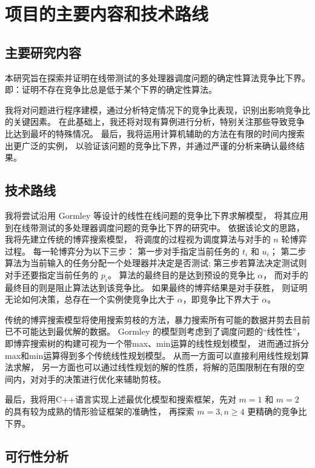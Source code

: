 \section{项目的主要内容和技术路线}

\subsection{主要研究内容}

本研究旨在探索并证明在线带测试的多处理器调度问题的确定性算法竞争比下界。
即：证明不存在竞争比总是低于某个下界的确定性算法。

我将对问题进行程序建模，通过分析特定情况下的竞争比表现，识别出影响竞争比的关键因素。
在此基础上，我还将对现有算例进行分析，特别关注那些导致竞争比达到最坏的特殊情况。
最后，我将运用计算机辅助的方法在有限的时间内搜索出更广泛的实例，
以验证该问题的竞争比下界，并通过严谨的分析来确认最终结果。

\subsection{技术路线}

我将尝试沿用 Gormley 等设计的线性在线问题的竞争比下界求解模型\cite{gormley2000generating}，
将其应用到在线带测试的多处理器调度问题的竞争比下界的研究中。
依据该论文的思路，我将先建立传统的博弈搜索模型，
将调度的过程视为调度算法与对手的 $n$ 轮博弈过程。
每一轮博弈分为以下三步：
第一步对手指定当前任务的 $t_i$ 和 $u_i$；
第二步算法为当前输入的任务分配一个处理器并决定是否测试;
第三步若算法决定测试则对手还要指定当前任务的 $p_i$。
算法的最终目的是达到预设的竞争比 $\alpha$，
而对手的最终目的则是阻止算法达到该竞争比。
如果最终的博弈结果是对手获胜，
则证明无论如何决策，总存在一个实例使竞争比大于 $\alpha$，即竞争比下界大于 $\alpha$。

传统的博弈搜索模型将使用搜索剪枝的方法，暴力搜索所有可能的数据并剪去目前已不可能达到最优解的数据。
Gormley 的模型则考虑到了调度问题的“线性性”，即博弈搜索树的构建可视为一个带max、min运算的线性规划模型，
进而通过拆分max和min运算得到多个传统线性规划模型。
从而一方面可以直接利用线性规划算法求解，
另一方面也可以通过线性规划的解的性质，将解的范围限制在有限的空间内，对对手的决策进行优化来辅助剪枝。

最后，我将用C++语言实现上述最优化模型和搜索框架，先对 $m=1$ 和 $m=2$ 的具有较为成熟的情形验证框架的准确性，
再探索 $m=3, n\geq 4$ 更精确的竞争比下界。

\subsection{可行性分析}

